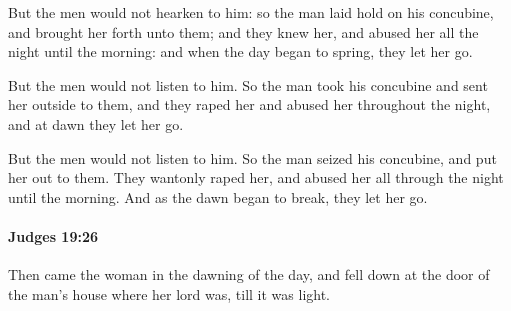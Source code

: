 			\begin{versebox}
					\item[BHS] 
					\item[ASV] But the men would not hearken to him: so the man laid hold on his concubine, and brought her forth unto them; and they knew her, and abused her all the night until the morning: and when the day began to spring, they let her go.
					\item[NIV] But the men would not listen to him. So the man took his concubine and sent her outside to them, and they raped her and abused her throughout the night, and at dawn they let her go.
					\item[NRSV] But the men would not listen to him. So the man seized his concubine, and put her out to them. They wantonly raped her, and abused her all through the night until the morning. And as the dawn began to break, they let her go.
			\end{versebox}

		\paragraph{Judges 19:26} %
			\label{JUDGES-19-26}

			Then came the woman in the dawning of the day, and fell down at the door of the man’s house where her lord was, till it was light.

